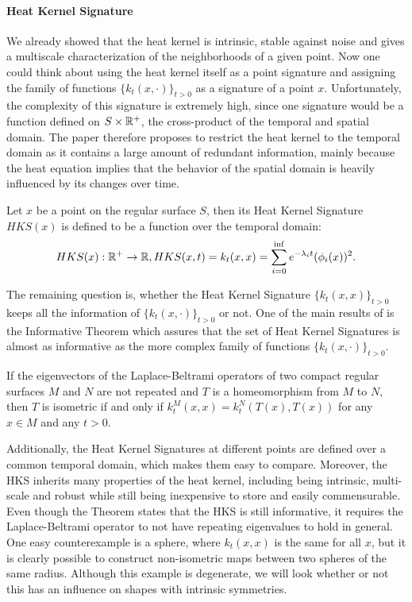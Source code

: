 \paragraph{Heat Kernel Signature}
We already showed that the  heat kernel is intrinsic, stable against noise and gives a multiscale characterization of the neighborhoods of a given point.
Now one could think about using the heat kernel itself as a point signature and assigning the family of functions $\{k_t(x,\cdot)\}_{t>0}$ as a signature of a point $x$.
Unfortunately, the complexity of this signature is extremely high, since one signature would be a function defined on $S \times \mathbb{R}^+$, the cross-product of the temporal and spatial domain.
The paper therefore proposes to restrict the heat kernel to the temporal domain as it contains a large amount of redundant information, mainly because the heat equation implies that the behavior of the spatial domain is heavily influenced by its changes over time.
\begin{mydef}
	Let $x$ be a point on the regular surface $S$, then its Heat Kernel Signature $HKS(x)$ is defined to be a function over the temporal domain:
	\begin{equation}
		HKS(x): \mathbb{R}^+ \rightarrow \mathbb{R}, HKS(x,t) = k_t(x,x) = \sum_{i = 0}^{\inf} e^{-\lambda_i t}(\phi_i(x))^2.
		\label{eq:hks:def}
	\end{equation}
\end{mydef}
The remaining question is, whether the Heat Kernel Signature $\{k_t(x,x)\}_{t>0}$ keeps all the information of $\{k_t(x,\cdot)\}_{t>0}$ or not.
One of the main results of \cite{sun2009concise} is the Informative Theorem which assures that the set of Heat Kernel Signatures is almost as informative as the more complex family of functions $\{k_t(x,\cdot)\}_{t>0}$.
\begin{theorem}
	If the eigenvectors of the Laplace-Beltrami operators of two compact regular surfaces $M$ and $N$ are not repeated and $T$ is a homeomorphism from $M$ to $N$, then $T$ is isometric if and only if $k_t^M(x,x) = k_t^N(T(x),T(x))$ for any $x\in M$ and any $t>0$.
\end{theorem}
Additionally, the Heat Kernel Signatures at different points are defined over a common temporal domain, which makes them easy to compare.
Moreover, the HKS inherits many properties of the heat kernel, including being intrinsic, multi-scale and robust while still being inexpensive to store and easily commensurable.
Even though the Theorem states that the HKS is still informative, it requires the Laplace-Beltrami operator to not have repeating eigenvalues to hold in general.
One easy counterexample is  a sphere, where $k_t(x,x)$ is the same for all $x$, but it is clearly possible to construct non-isometric maps between two spheres of the same radius.  Although this example is degenerate, we will look whether or not this has an influence on shapes with intrinsic symmetries.

